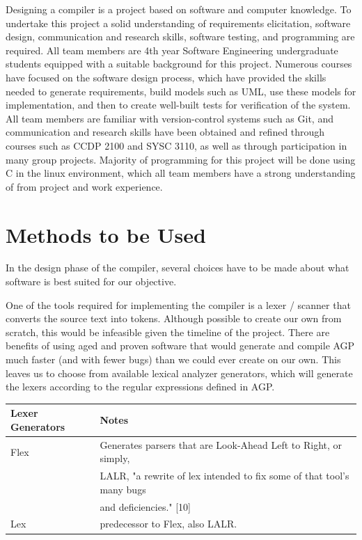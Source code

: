 \documentclass[11pt]{article}
\begin{document}
Designing a compiler is a project based on software and computer knowledge. To undertake this project a solid understanding of requirements elicitation, software design, communication and research skills, software testing, and programming are required.  All team members are 4th year Software Engineering undergraduate students equipped with a suitable background for this project. Numerous courses have focused on the software design process, which have provided the skills needed to generate requirements, build models such as UML, use these models for implementation, and then to create well-built tests for verification of the system. All team members are familiar with version-control systems such as Git, and communication and research skills have been obtained and refined through courses such as CCDP 2100 and SYSC 3110, as well as through participation in many group projects. Majority of programming for this project will be done using C in the linux environment, which all team members have a strong understanding of from project and work experience.


\section{Methods to be Used}

In the design phase of the compiler, several choices have to be made about what software is best suited for our objective. 

One of the tools required for implementing the compiler is a lexer / scanner that converts the source text into tokens. Although possible to create our own from scratch, this would be infeasible given the timeline of the project. There are benefits of using aged and proven software that would generate and compile AGP much faster (and with fewer bugs) than we could ever create on our own. This leaves us to choose from available lexical analyzer generators, which will generate the lexers according to the regular expressions defined in AGP.

\begin{center}
\begin{tabular}{ |l | l|  }
 \hline
 \textbf{Lexer Generators} & \textbf{Notes} \\
 \hline 
 Flex & Generates parsers that are Look-Ahead Left to Right, or simply,\\ 
 	  &
 LALR, "a rewrite of lex intended to fix some of that tool's many bugs \\
 	  &
 and deficiencies." [10] \\ 
 \hline 
 Lex & predecessor to Flex, also LALR. \\
 \hline
\end{tabular}
\end{center}
\end{document}
